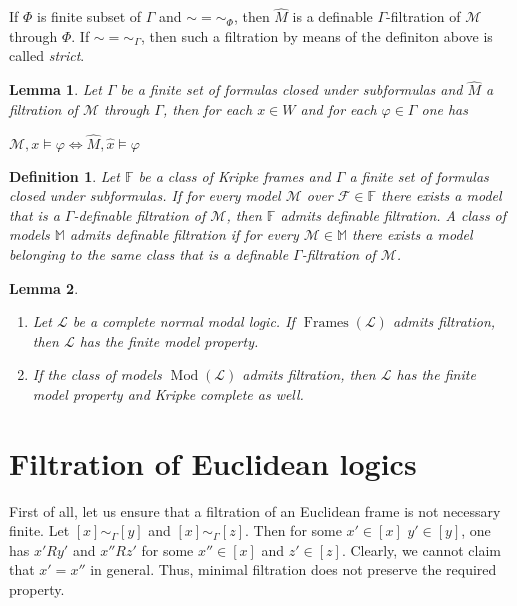 \documentclass[a4paper]{article}
\theoremstyle{defin}
\newtheorem{defin}{Definition}
\theoremstyle{theorem}
\theoremstyle{prop}
\theoremstyle{lemma}
\newtheorem{lemma}{Lemma}
\theoremstyle{ex}
\theoremstyle{col}
\begin{document}
If $\Phi$ is finite subset of $\Gamma$ and $\sim = \sim_{\Phi}$, then $\widehat{M}$ is a definable $\Gamma$-filtration of $\mathcal{M}$ through $\Phi$. If $\sim = \sim_{\Gamma}$, then such a filtration by means of the definiton above is called \emph{strict}.

\begin{lemma}
  Let $\Gamma$ be a finite set of formulas closed under subformulas and $\widehat{M}$ a filtration of $\mathcal{M}$ through $\Gamma$, then for each $x \in W$ and for each $\varphi \in \Gamma$ one has
  \begin{center}
    $\mathcal{M}, x \models \varphi \Leftrightarrow \widehat{M}, \hat{x} \models \varphi$
  \end{center}
\end{lemma}

\begin{defin} Let $\mathbb{F}$ be a class of Kripke frames and $\Gamma$ a finite set of formulas closed under subformulas. If for every model $\mathcal{M}$ over $\mathcal{F} \in \mathbb{F}$ there exists a model that is a $\Gamma$-definable filtration of $\mathcal{M}$, then $\mathbb{F}$ admits definable filtration. A class of models $\mathbb{M}$ admits definable filtration if for every $\mathcal{M} \in \mathbb{M}$ there exists a model belonging to the same class that is a definable $\Gamma$-filtration of $\mathcal{M}$.
\end{defin}

\begin{lemma}
  $ $

\begin{enumerate}
  \item Let $\mathcal{L}$ be a complete normal modal logic. If $\operatorname{Frames}(\mathcal{L})$ admits filtration, then $\mathcal{L}$ has the finite model property.
  \item If the class of models $\operatorname{Mod}(\mathcal{L})$ admits filtration, then $\mathcal{L}$ has the finite model property and Kripke complete as well.
\end{enumerate}
\end{lemma}

\section{Filtration of Euclidean logics}

First of all, let us ensure that a filtration of an Euclidean frame is not necessary finite.
Let $[x] \sim_{\Gamma} [y]$ and $[x] \sim_{\Gamma} [z]$. Then for some $x' \in [x]$ $y' \in [y]$, one has
$x' R y'$ and $x'' R z'$ for some $x'' \in [x]$ and $z' \in [z]$. Clearly, we cannot claim that $x' = x''$ in general. Thus, minimal filtration does not preserve the required property.
\end{document}
